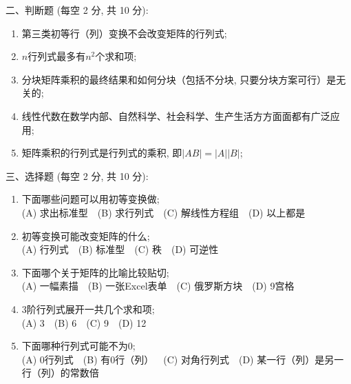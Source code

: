 \documentclass[12pt,a4paper]{ctexart}%
\begin{document}
%
\noindent 二、判断题 (每空 2 分, 共 10 分):%
\begin{enumerate}[1)]%
\item%
第三类初等行（列）变换不会改变矩阵的行列式;~~\mypar{}%
\item%
$n$行列式最多有$n^2$个求和项;~~\mypar{}%
\item%
分块矩阵乘积的最终结果和如何分块（包括不分块, 只要分块方案可行）是无关的;~~\mypar{}%
\item%
线性代数在数学内部、自然科学、社会科学、生产生活方方面面都有广泛应用;~~\mypar{}%
\item%
矩阵乘积的行列式是行列式的乘积, 即$|AB|=|A||B|$;~~\mypar{}%
\end{enumerate}%


%
\noindent 三、选择题 (每空 2 分, 共 10 分):%
\begin{enumerate}[1)]%
\item%
下面哪些问题可以用初等变换做;~~\mypar{}\\
(A) 求出标准型~~(B) 求行列式~~(C) 解线性方程组~~(D) 以上都是%
\item%
初等变换可能改变矩阵的什么;~~\mypar{}\\
(A) 行列式~~(B) 标准型~~(C) 秩~~(D) 可逆性%
\item%
下面哪个关于矩阵的比喻比较贴切;~~\mypar{}\\
(A) 一幅素描~~(B) 一张Excel表单~~(C) 俄罗斯方块~~(D) 9宫格%
\item%
3阶行列式展开一共几个求和项;~~\mypar{}\\
(A) 3~~(B) 6~~(C) 9~~(D) 12%
\item%
下面哪种行列式可能不为0;~~\mypar{}\\
(A) 0行列式~~(B) 有0行（列）~~(C) 对角行列式~~(D) 某一行（列）是另一行（列）的常数倍%
\end{enumerate}%
\end{document}
